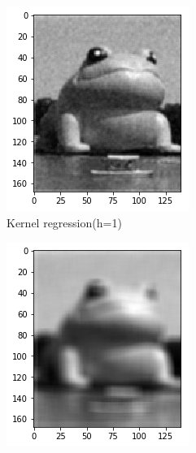 \documentclass{beamer}
\begin{document}
\begin{frame}
\begin{figure}[htb]
\begin{subfigure}[b]{0.24\linewidth}
      \includegraphics[width=\linewidth]{images/noise_removal_2.png}
      \caption{Kernel regression(h=1)}
    \end{subfigure}
    \begin{subfigure}[b]{0.24\linewidth}
      \includegraphics[width=\linewidth]{images/noise_removal_3.png}

\end{subfigure}
\end{figure}
\end{frame}
\end{document}
